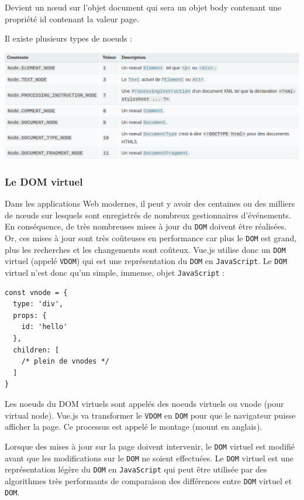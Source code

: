 \documentclass{article}
\begin{document}
Devient un nœud sur l'objet document qui sera un objet body contenant une propriété id contenant la valeur page.

Il existe plusieurs types de noeuds :
\begin{center}
\includegraphics[width=15cm]{images/image07.png}
\end{center}

\subsubsection{Le DOM virtuel}
Dans les applications Web modernes, il peut y avoir des centaines ou des milliers de nœuds sur lesquels sont enregistrés de nombreux gestionnaires d'événements. En conséquence, de très nombreuses mises à jour du {\tt DOM} doivent être réalisées. Or, ces mises à jour sont très coûteuses en performance car plus le {\tt DOM} est grand, plus les recherches et les changements sont coûteux. {\color{monOrange}Vue.js} utilise donc un {\tt DOM} virtuel (appelé {\tt VDOM}) qui est une représentation du {\tt DOM} en {\tt JavaScript}. Le {\tt DOM } virtuel n'est donc qu'un simple, immense, objet {\tt JavaScript} :
\begin{verbatim}
const vnode = {
  type: 'div',
  props: {
    id: 'hello'
  },
  children: [
    /* plein de vnodes */
  ]
}
\end{verbatim} 

Les noeuds du DOM virtuels sont appelés des noeuds virtuels ou {\color{monOrange}vnode} (pour virtual node). {\color{monOrange}Vue.js} va transformer le {\tt VDOM} en {\tt DOM} pour que le navigateur puisse afficher la page. Ce processus est appelé le montage (mount en anglais).

Lorsque des mises à jour sur la page doivent intervenir, le {\tt DOM} virtuel est modifié avant que les modifications sur le {\tt DOM} ne soient effectuées. Le {\tt DOM} virtuel est une représentation légère du {\tt DOM} en {\tt JavaScript} qui peut être utilisée par des algorithmes très performants de comparaison des différences entre {\tt DOM} virtuel et {\tt DOM}.
\end{document}
